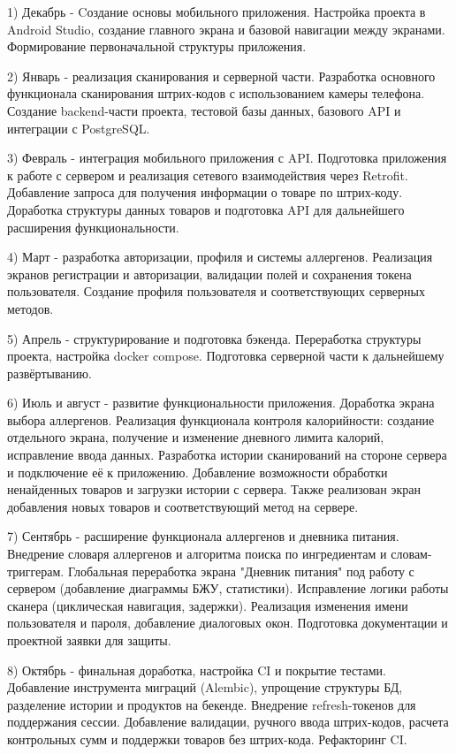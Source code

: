 \documentclass[14pt,a4paper]{extarticle}
\begin{document}
1) Декабрь - Cоздание основы мобильного приложения.
Настройка проекта в Android Studio, создание главного экрана и базовой навигации между экранами. Формирование первоначальной структуры приложения.

2) Январь - реализация сканирования и серверной части.
Разработка основного функционала сканирования штрих-кодов с использованием камеры телефона. Создание backend-части проекта, тестовой базы данных, базового API и интеграции с PostgreSQL.

3) Февраль - интеграция мобильного приложения с API.
Подготовка приложения к работе с сервером и реализация сетевого взаимодействия через Retrofit. Добавление запроса для получения информации о товаре по штрих-коду. Доработка структуры данных товаров и подготовка API для дальнейшего расширения функциональности.

4) Март - разработка авторизации, профиля и системы аллергенов. Реализация экранов регистрации и авторизации, валидации полей и сохранения токена пользователя. Создание профиля пользователя и соответствующих серверных методов.

5) Апрель - структурирование и подготовка бэкенда.
Переработка структуры проекта, настройка docker compose. Подготовка серверной части к дальнейшему развёртыванию.

6) Июль и август - развитие функциональности приложения.
Доработка экрана выбора аллергенов. Реализация функционала контроля калорийности: создание отдельного экрана, получение и изменение дневного лимита калорий, исправление ввода данных. Разработка истории сканирований на стороне сервера и подключение её к приложению. Добавление возможности обработки ненайденных товаров и загрузки истории с сервера. Также реализован экран добавления новых товаров и соответствующий метод на сервере.

7) Сентябрь - расширение функционала аллергенов и дневника питания.
Внедрение словаря аллергенов и алгоритма поиска по ингредиентам и словам-триггерам. Глобальная переработка экрана "Дневник питания" под работу с сервером (добавление диаграммы БЖУ, статистики). Исправление логики работы сканера (циклическая навигация, задержки). Реализация изменения имени пользователя и пароля, добавление диалоговых окон. Подготовка документации и проектной заявки для защиты.

8) Октябрь - финальная доработка, настройка CI и покрытие тестами.
Добавление инструмента миграций (Alembic), упрощение структуры БД, разделение истории и продуктов на бекенде. Внедрение refresh-токенов для поддержания сессии. Добавление валидации, ручного ввода штрих-кодов, расчета контрольных сумм и поддержки товаров без штрих-кода. Рефакторинг CI.
\end{document}
